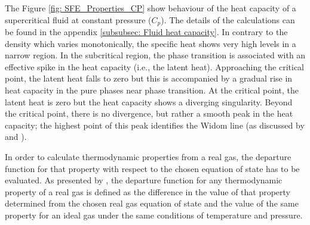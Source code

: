 \documentclass[../Article_Model_Parameters.tex]{subfiles}
\begin{document}
    The Figure \ref{fig: SFE_Properties_CP} show behaviour of the heat capacity of a supercritical fluid at constant pressure ($C_p$). The details of the calculations can be found in the appendix \ref{subsubsec: Fluid heat capacity}. In contrary to the density which varies monotonically, the specific heat shows very high levels in a narrow region. In the subcritical region, the phase transition is associated with an effective spike in the heat capacity (i.e., the latent heat). Approaching the critical point, the latent heat falls to zero but this is accompanied by a gradual rise in heat capacity in the pure phases near phase transition. At the critical point, the latent heat is zero but the heat capacity shows a diverging singularity. Beyond the critical point, there is no divergence, but rather a smooth peak in the heat capacity; the highest point of this peak identifies the Widom line (as discussed by \citet{Simeoni2010} and \citet{Banuti2019}).

    In order to calculate thermodynamic properties from a real gas, the departure function for that property with respect to the chosen equation of state has to be evaluated. As presented by \citet{Elliott2011}, the departure function for any thermodynamic property of a real gas is defined as the difference in the value of that property determined from the chosen real gas equation of state and the value of the same property for an ideal gas under the same conditions of temperature and pressure. %

			
			
\end{document}
